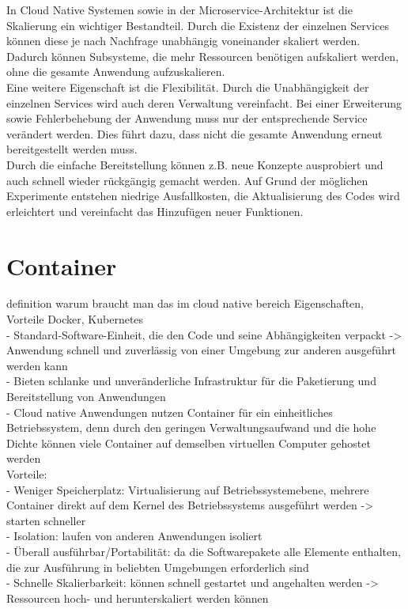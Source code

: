 In Cloud Native Systemen sowie in der Microservice-Architektur ist die Skalierung ein wichtiger Bestandteil. Durch die Existenz der einzelnen Services können diese je nach Nachfrage unabhängig voneinander skaliert werden. Dadurch können Subsysteme, die mehr Ressourcen benötigen aufskaliert werden, ohne die gesamte Anwendung aufzuskalieren.\\
Eine weitere Eigenschaft ist die Flexibilität. Durch die Unabhängigkeit der einzelnen Services wird auch deren Verwaltung vereinfacht. Bei einer Erweiterung sowie Fehlerbehebung der Anwendung muss nur der entsprechende Service verändert werden. Dies führt dazu, dass nicht die gesamte Anwendung erneut bereitgestellt werden muss.\\
Durch die einfache Bereitstellung können z.B. neue Konzepte ausprobiert und auch schnell wieder rückgängig gemacht werden. Auf Grund der möglichen Experimente entstehen niedrige Ausfallkosten, die Aktualisierung des Codes wird erleichtert und vereinfacht das Hinzufügen neuer Funktionen.
\\

\section{Container}
definition
warum braucht man das im cloud native bereich
Eigenschaften, Vorteile
Docker, Kubernetes\\

- Standard-Software-Einheit, die den Code und seine Abhängigkeiten verpackt
 -> Anwendung schnell und zuverlässig von einer Umgebung zur anderen ausgeführt werden kann \\
- Bieten schlanke und unveränderliche Infrastruktur für die Paketierung und Bereitstellung von Anwendungen\\
- Cloud native Anwendungen nutzen Container für ein einheitliches Betriebssystem, denn durch den geringen Verwaltungsaufwand und die hohe Dichte können viele Container auf demselben virtuellen Computer gehostet werden\\

Vorteile: \\
- Weniger Speicherplatz: Virtualisierung auf Betriebssystemebene, mehrere Container direkt auf dem Kernel des Betriebssystems ausgeführt werden -> starten schneller\\
- Isolation: laufen von anderen Anwendungen isoliert\\
- Überall ausführbar/Portabilität: da die Softwarepakete alle Elemente enthalten, die zur Ausführung in beliebten Umgebungen erforderlich sind\\
- Schnelle Skalierbarkeit: können schnell gestartet und angehalten werden -> Ressourcen hoch- und herunterskaliert werden können\\

